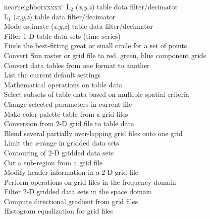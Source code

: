 \begin{tabbing}
nearneighborxxxxx \=					\kill
{}	\>	L$_2$ (\emph{x},\emph{y},\emph{z}) table data filter/decimator \\ 
	\>	L$_1$ (\emph{x},\emph{y},\emph{z}) table data filter/decimator \\ 
	\>	Mode estimate (\emph{x},\emph{y},\emph{z}) table data filter/decimator \\ 
	\>	Filter 1-D table data sets (time series) \\ 
	\>	Finds the best-fitting great or small circle for a set of points \\ 
	\>	Convert Sun raster or grid file to red, green, blue component grids \\ 
	\>	Convert data tables from one format to another \\ 
	\>	List the current default settings \\ 
	\>	Mathematical operations on table data \\ 
	\>	Select subsets of table data based on multiple spatial criteria \\ 
	\>	Change selected parameters in current  file \\ 
	\>	Make color palette table from a grid files \\ 
	\>	Conversion from 2-D grid file to table data \\ 
	\>	Blend several partially over-lapping grid files onto one grid \\ 
	\>	Limit the \emph{z}-range in gridded data sets \\ 
	\>	Contouring of 2-D gridded data sets \\ 
	\>	Cut a sub-region from a grid file \\ 
	\>	Modify header information in a 2-D grid file \\ 
	\>	Perform operations on grid files in the frequency domain \\ 
	\>	Filter 2-D gridded data sets in the space domain \\ 
	\>	Compute directional gradient from grid files \\ 
	\>	Histogram equalization for grid files \\ 

\end{tabbing}
